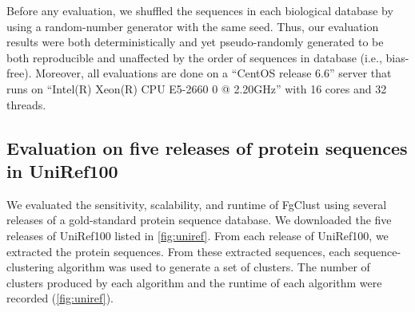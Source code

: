 \documentclass{bioinfo}
\begin{document}
Before any evaluation, we shuffled the sequences in each biological database by using a random-number generator with the same seed.
Thus, our evaluation results were both deterministically and yet pseudo-randomly generated to be both reproducible and unaffected by the order of sequences in database (i.e., bias-free).
Moreover, all evaluations are done on a ``CentOS release 6.6'' server that runs on ``Intel(R) Xeon(R) CPU E5-2660 0 @ 2.20GHz'' with 16 cores and 32 threads.

\subsection{Evaluation on five releases of protein sequences in UniRef100}

We evaluated the sensitivity, scalability, and runtime of FgClust using several releases of a gold-standard protein sequence database.
We downloaded the five releases of UniRef100 \citep{suzek2007uniref} listed in \cref{fig:uniref}.
From each release of UniRef100, we extracted the protein sequences.
From these extracted sequences, each sequence-clustering algorithm was used to generate a set of clusters.
The number of clusters produced by each algorithm and the runtime of each algorithm were recorded (\cref{fig:uniref}).
\end{document}
